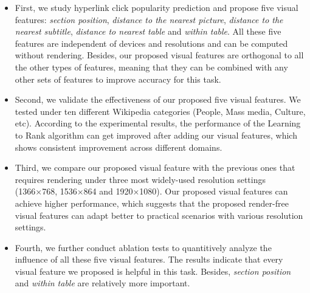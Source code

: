 \begin{itemize}

    \item First, we study hyperlink click popularity prediction and propose five visual features: \emph{section position}, \emph{distance to the nearest picture}, \emph{distance to the nearest subtitle}, \emph{distance to nearest table} and \emph{within table}. All these five features are independent of devices and resolutions and can be computed without rendering. Besides, our proposed visual features are orthogonal to all the other types of features, meaning that they can be combined with any other sets of features to improve accuracy for this task.

    \item Second, we validate the effectiveness of our proposed five visual features. We tested under ten different Wikipedia categories (People, Mass media, Culture, etc). According to the experimental results, the performance of the Learning to Rank algorithm can get improved after adding our visual features, which shows consistent improvement across different domains.
    
    \item Third, we compare our proposed visual feature with the previous ones that requires rendering \cite{dimitrov2017makes} under three most widely-used resolution settings (1366×768, 1536×864 and 1920×1080). Our proposed visual features can achieve higher performance, which suggests that the proposed render-free visual features can adapt better to practical scenarios with various resolution settings.

    \item Fourth, we further conduct ablation tests to quantitively analyze the influence of all these five visual features. The results indicate that every visual feature we proposed is helpful in this task. Besides, \emph{section position} and \emph{within table} are relatively more important.

\end{itemize}
